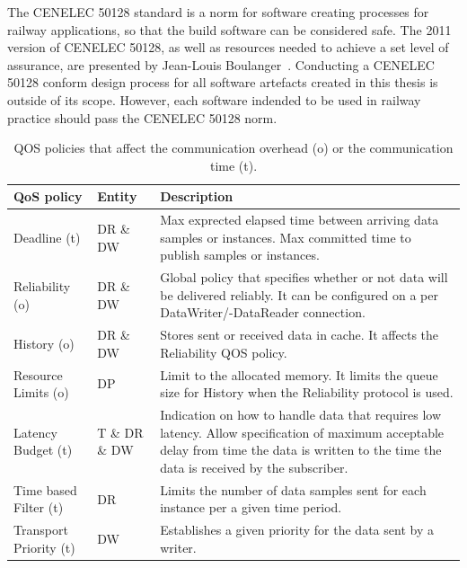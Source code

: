 The CENELEC 50128 standard is a norm for software creating processes for railway applications, so that the build software can be considered safe.
The 2011 version of CENELEC 50128, as well as resources needed to achieve a set level of assurance, are presented by Jean-Louis Boulanger~\cite{BoulangerStandards}.
Conducting a CENELEC 50128 conform design process for all software artefacts created in this thesis is outside of its scope.
However, each software indended to be used in railway practice should pass the CENELEC 50128 norm.
\\

\begin{table}[h!]
	\begin{center}
		\caption{\Gls*{QOS} policies that affect the communication overhead (o) or the communication time (t).}
		\label{tab:qos_garciavalls}
		\begin{tabularx}{\textwidth}{|l|l|X|}
			\hline
			\textbf{QoS policy} & \textbf{Entity} & \textbf{Description}\\
			\hline \hline
			Deadline (t) & DR \& DW & Max exprected elapsed time between arriving data samples or instances. Max committed time to publish samples or instances.\\
			\hline
			Reliability (o) & DR \& DW & Global policy that specifies whether or not data will be delivered reliably. It can be configured on a per DataWriter/-DataReader connection. \\
			\hline
			History (o) & DR \& DW & Stores sent or received data in cache. It affects the Reliability \gls*{QOS} policy. \\
			\hline
			Resource Limits (o) & DP & Limit to the allocated memory. It limits the queue size for History when the Reliability protocol is used. \\
			\hline
			Latency Budget (t) & T \& DR \& DW & Indication on how to handle data that requires low latency. Allow specification of maximum acceptable delay from time the data is written to the time the data is received by the subscriber. \\
			\hline
			Time based Filter (t) & DR & Limits the number of data samples sent for each instance per a given time period. \\
			\hline
			Transport Priority (t) & DW & Establishes a given priority for the data sent by a writer.\\
			\hline
		\end{tabularx}
	\end{center}
\end{table}

